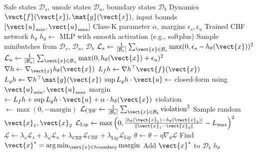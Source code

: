 \begin{algorithm}[H]
\caption{Neural Control Barrier Function Training}
\label{alg:ncbf_training}
\begin{algorithmic}[1]
\REQUIRE Safe states $\mathcal{D}_s$, unsafe states $\mathcal{D}_u$, boundary states $\mathcal{D}_b$
\REQUIRE Dynamics $\vect{f}(\vect{x}), \mat{g}(\vect{x})$, input bounds $[\vect{u}_{\min}, \vect{u}_{\max}]$
\REQUIRE Class-K parameter $\alpha$, margins $\epsilon_s, \epsilon_u$
\ENSURE Trained CBF network $h_\theta$
\STATE
\STATE {}
\STATE $h_\theta \gets$ MLP with smooth activation (e.g., softplus)
\STATE
{}
    \STATE Sample minibatches from $\mathcal{D}_s$, $\mathcal{D}_u$, $\mathcal{D}_b$
    \STATE
    \STATE {}
    \STATE $\mathcal{L}_s \gets \frac{1}{|\mathcal{B}_s|}\sum_{\vect{x} \in \mathcal{B}_s} \max(0, \epsilon_s - h_\theta(\vect{x}))^2$
    \STATE
    \STATE {}
    \STATE $\mathcal{L}_u \gets \frac{1}{|\mathcal{B}_u|}\sum_{\vect{x} \in \mathcal{B}_u} \max(0, h_\theta(\vect{x}) + \epsilon_u)^2$
    \STATE
    \STATE {}
        \STATE $\nabla h \gets \nabla_{\vect{x}} h_\theta(\vect{x})$
        \STATE $L_f h \gets \nabla h^\top \vect{f}(\vect{x})$
        \STATE $L_g h \gets \nabla h^\top \mat{g}(\vect{x})$
        \STATE
        \STATE {}
        \STATE $\sup L_g h \cdot \vect{u} \gets$ closed-form using $\vect{u}_{\min}, \vect{u}_{\max}$
        \STATE margin $\gets L_f h + \sup L_g h \cdot \vect{u} + \alpha \cdot h_\theta(\vect{x})$
        \STATE violation $\gets \max(0, -\text{margin})$
    \ENDFOR
    \STATE $\mathcal{L}_{\text{CBF}} \gets \frac{1}{|\mathcal{B}_b|}\sum_{\vect{x} \in \mathcal{B}_b} \text{violation}^2$
    \STATE
    \STATE {}
    \STATE Sample random $\vect{x}_1, \vect{x}_2$
    \STATE $\mathcal{L}_{\text{Lip}} \gets \max\left(0, \frac{|h_\theta(\vect{x}_1) - h_\theta(\vect{x}_2)|}{\|\vect{x}_1 - \vect{x}_2\|} - L_{\max}\right)^2$
    \STATE
    \STATE $\mathcal{L} \gets \lambda_s \mathcal{L}_s + \lambda_u \mathcal{L}_u + \lambda_{\text{CBF}} \mathcal{L}_{\text{CBF}} + \lambda_{\text{Lip}} \mathcal{L}_{\text{Lip}}$
    \STATE $\theta \gets \theta - \eta \nabla_\theta \mathcal{L}$
    \STATE
    \STATE {}
        \STATE Find $\vect{x}^* = \arg\min_{\vect{x} \in \text{boundary}} \text{margin}$
            \STATE Add $\vect{x}^*$ to $\mathcal{D}_b$
        \ENDIF
    \ENDIF
\ENDFOR
\RETURN $h_\theta$
\end{algorithmic}
\end{algorithm}

